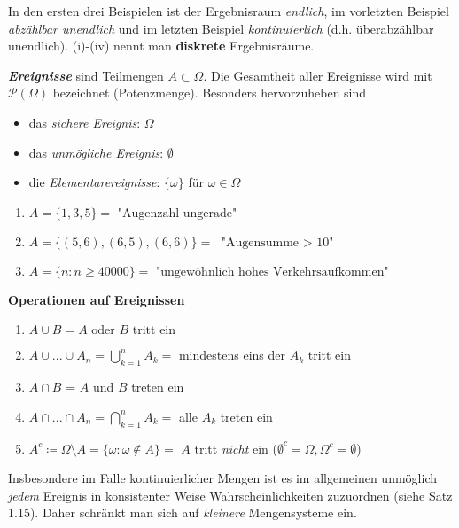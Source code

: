 \documentclass[a4paper, landscape,twocolumn,fontsize=9pt]{scrartcl}
\newcommand{\vip}[1]{\textit{\textbf{#1}}}
\begin{document}
In den ersten drei Beispielen ist der Ergebnisraum \emph{endlich}, im vorletzten Beispiel \emph{abzählbar unendlich} und im letzten Beispiel \emph{kontinuierlich} (d.h. überabzählbar unendlich). (i)-(iv) nennt man \textbf{diskrete} Ergebnisräume.

\vip{Ereignisse} sind Teilmengen $A \subset \Omega$. Die Gesamtheit aller Ereignisse wird mit $\mathcal P(\Omega)$ bezeichnet (Potenzmenge). Besonders hervorzuheben sind
\begin{itemize}
	\item das \emph{sichere Ereignis}: $\Omega$
	\item das \emph{unmögliche Ereignis}: $\emptyset$ 
	\item die \emph{Elementarereignisse}: $\{ \omega \}$ für $\omega \in \Omega$
\end{itemize}

\begin{example}{}{}
\begin{enumerate}
	\item $A = \{ 1,3,5 \} = \text{ "Augenzahl ungerade"}$
	\item $A = \{ (5,6), (6,5), (6,6) \} = \text{ "Augensumme $>$ 10"}$
	\item $A = \{ n : n \geq 40000\} =\text{ "ungewöhnlich hohes Verkehrsaufkommen"} $
\end{enumerate}	
\end{example}

\textbf{Operationen auf Ereignissen}
\begin{enumerate}
	\item $A \cup B = A \text{ oder } B \text{ tritt ein}$
	\item $A \cup ... \cup A_n = \bigcup_{k=1}^n A_k =$ mindestens eins der $A_k$ tritt ein
	\item $A \cap B$ = $A$ und $B$ treten ein
	\item $A \cap ... \cap A_n = \bigcap_{k=1}^n A_k = $ alle $A_k$ treten ein
	\item $A^c \coloneqq \Omega \setminus A = \{ \omega : \omega \notin A \} =$ $A$ tritt \emph{nicht} ein ($\emptyset^c = \Omega, \Omega^c = \emptyset$)
\end{enumerate}

\begin{important}{}{}
Insbesondere im Falle kontinuierlicher Mengen ist es im allgemeinen unmöglich \emph{jedem} Ereignis in konsistenter Weise Wahrscheinlichkeiten zuzuordnen (siehe Satz 1.15). Daher schränkt man sich auf \emph{kleinere} Mengensysteme ein.
\end{important}
\end{document}

